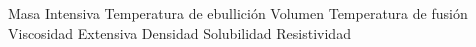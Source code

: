 \begin{minipage}{0.4\linewidth}
    \checkboxchar{ {\color{cadmiumorange}
    $\Box$}
    }
        \begin{checkboxes}
            \choice Masa \vspace{0.5cm}
            \choice Intensiva\vspace{0.5cm}
            \choice Temperatura de ebullici\'on    \vspace{0.5cm}
            \choice Volumen    \vspace{0.5cm}
            \choice Temperatura de fusi\'on    \vspace{0.5cm}
            \choice Viscosidad  \vspace{0.5cm}
            \choice Extensiva \vspace{0.5cm}
            \choice Densidad \vspace{0.5cm}
            \choice Solubilidad \vspace{0.5cm}
            \choice Resistividad
        \end{checkboxes}
    
\end{minipage}
